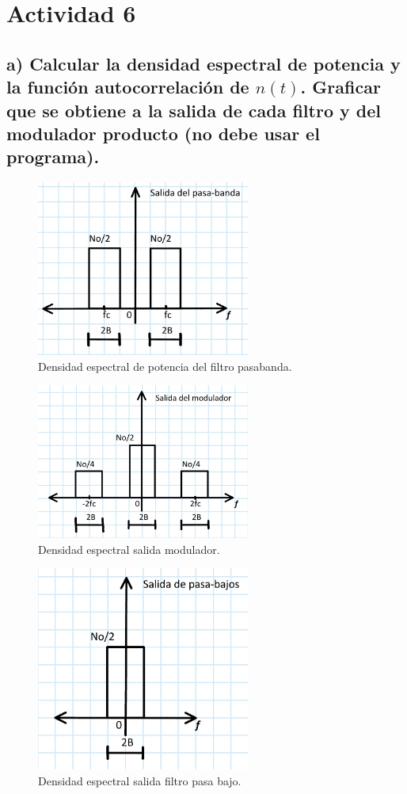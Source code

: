 \section{Actividad 6}


\subsection*{a) Calcular la densidad espectral de potencia y la función autocorrelación de $n(t)$. Graficar que se obtiene a la salida de cada filtro y del modulador producto (no debe usar el programa).} 

	\begin{figure}[h!]
		\centering
		\includegraphics[width=7cm]{parte_teorica/actividad6_pasabanda.jpg}
		\caption{Densidad espectral de potencia del filtro pasabanda.}
		\label{fig:6pasabanda}
	\end{figure}

    \begin{figure}[h!]
		\centering
		\includegraphics[width=7cm]{parte_teorica/actividad6_modulador.jpg}
		\caption{Densidad espectral salida modulador.}
		\label{fig:6modulador}
	\end{figure}


    \begin{figure}[h!]
		\centering
		\includegraphics[width=7cm]{parte_teorica/actividad6_pasabajo.jpg}
		\caption{Densidad espectral salida filtro pasa bajo.}
		\label{fig:6pasabajo}
	\end{figure}


